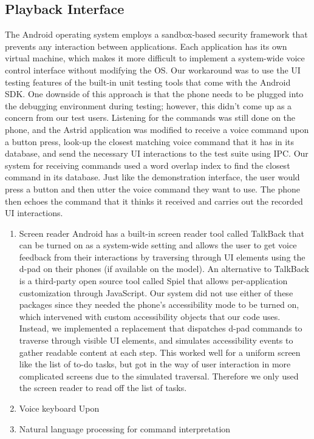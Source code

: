 \documentclass[letterpaper]{article}
\begin{document}
\subsection{Playback Interface}
The Android operating system employs a sandbox-based security framework that prevents any interaction between applications. 
Each application has its own virtual machine, which makes it more difficult to implement a system-wide voice control interface without modifying the OS.
Our workaround was to use the UI testing features of the built-in unit testing tools that come with the Android SDK.
One downside of this approach is that the phone needs to be plugged into the debugging environment during testing; however, 
this didn't come up as a concern from our test users. Listening for the commands was still done on the phone, 
and the Astrid application was modified to receive a voice command upon a button press, look-up the closest matching voice command 
that it has in its database, and send the necessary UI interactions to the test suite using IPC. Our system for receiving commands used 
a word overlap index to find the closest command in its database. Just like the demonstration interface, the user would press a button 
and then utter the voice command they want to use. The phone then echoes the command that it thinks it received and carries out the 
recorded UI interactions. 
 
\begin{enumerate}
\item Screen reader
Android has a built-in screen reader tool called TalkBack that can be turned on as a system-wide setting and allows the user to get 
voice feedback from their interactions by traversing through UI elements using the d-pad on their phones (if available on the model). 
An alternative to TalkBack is a third-party open source tool called Spiel that allows per-application customization through JavaScript. 
Our system did not use either of these packages since they needed the phone's accessibility mode to be turned on, which intervened with 
custom accessibility objects that our code uses. Instead, we implemented a replacement that dispatches d-pad commands to traverse 
through visible UI elements, and simulates accessibility events to gather readable content at each step. This worked well for a uniform 
screen like the list of to-do tasks, but got in the way of user interaction in more complicated screens due to the simulated traversal. 
Therefore we only used the screen reader to read off the list of tasks.

\item Voice keyboard
Upon 
\item Natural language processing for command interpretation
\end{enumerate}
\end{document}
